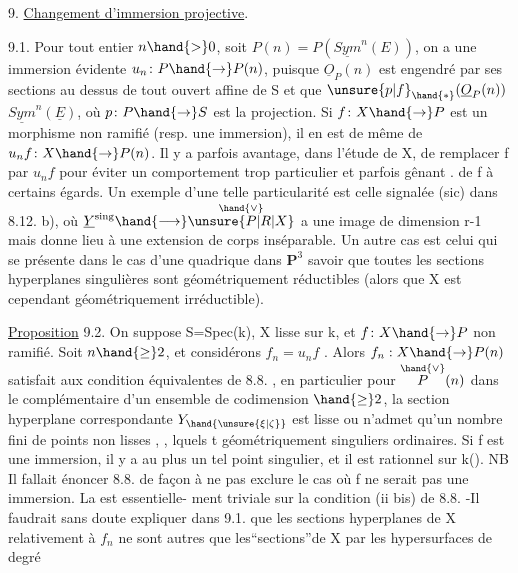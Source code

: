 
9. \uline{Changement d'immersion projective}.

9.1. Pour tout entier $n \hand{>} 0$, soit $P(n) = P(\underline{Sym}^n(E))$, on a une
immersion évidente $u_n\colon P \hand{\to} P(n)$, puisque $\underline{O}_P(n)$ est engendré par
ses sections au dessus de tout ouvert affine de S et que $\unsure{p|f}_{\hand{*}}(\underline{O}_P(n))$
$\underline{Sym}^n(\underline{E})$, où $p\colon P \hand{\to} S$ est la projection. Si $f\colon X\hand{\to} P$ est un morphisme
non ramifié (resp. une immersion), il en est de même de $u_n f\colon X \hand{\to} P(n)$.
Il y a parfois avantage, dans l'étude de X, de  remplacer f par $u_n f$ 
pour éviter un comportement trop particulier et parfois  gênant .
de f à certains égards. Un exemple d'une telle particularité est celle
 signalée (sic) dans 8.12. b),  où $\underline{Y}^{\mathrm{sing}} \hand{\longrightarrow} \overset{\hand{\vee}}{\unsure{P|R|X}}$ a une image de
dimension r-1 mais  donne lieu à une extension
de corps inséparable. Un autre cas est celui qui se présente dans le cas
d'une quadrique dans $\mathbf{P}^3$ savoir que
toutes les sections hyperplanes singulières sont géométriquement
réductibles (alors que X est cependant géométriquement irréductible).

\uline{Proposition} 9.2. On suppose S=Spec(k), X lisse sur k, et $f\colon X\hand{\to} P$ non
ramifié. Soit $n \hand{\geq} 2$, et considérons $f_n = u_n f$ . Alors $f_n : X \hand{\to} P(n)$
satisfait aux condition équivalentes de 8.8. , en particulier
pour \hand{$\unsure{\xi|\zeta} \in$} $\overset{\hand{\vee}}{P}(n)$ dans le complémentaire d'un ensemble de codimension $\hand{\geq} 2$,
la section hyperplane correspondante $Y_{\hand{\unsure{\xi|\zeta}}}$ est lisse  ou n'admet qu'un
nombre fini de points non lisses ,
, lquels t géométriquement singuliers
ordinaires. Si f est une immersion, il y a au
plus un tel point singulier, et il est rationnel sur k(\hand{$\unsure{\xi|\zeta}$}).
\placedmargin{$\|$} NB Il fallait énoncer 8.8. de façon à  ne pas exclure le
cas où f ne serait pas une immersion. La  est essentielle-%
ment triviale sur la condition (ii bis) de 8.8. -Il faudrait sans doute
expliquer dans 9.1. que les sections hyperplanes de X relativement à
 $f_n$ ne sont autres que les``sections''de X par les hypersurfaces de degré

